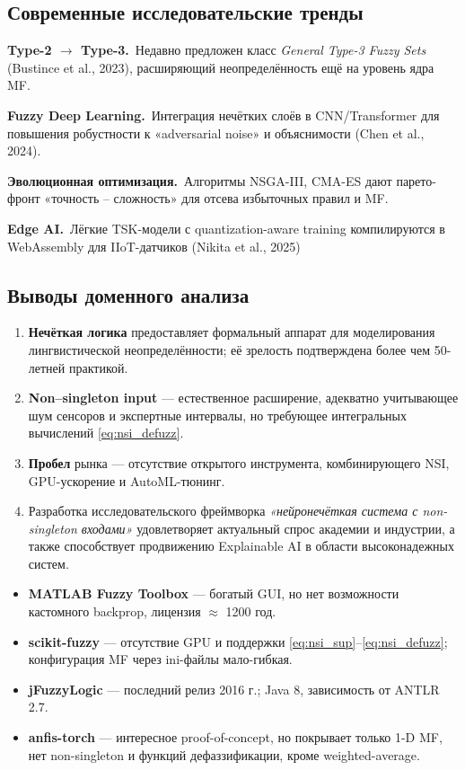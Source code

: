 \subsection{Современные исследовательские тренды}
\label{subsec:trends}

\textbf{Type-2 $\to$ Type-3.}\,
Недавно предложен класс \emph{General Type-3 Fuzzy Sets}
(Bustince et al., 2023), расширяющий неопределённость
ещё на уровень ядра MF.

\textbf{Fuzzy Deep Learning.}\,
Интеграция нечётких слоёв в CNN/Transformer
для повышения робустности к «adversarial noise»
и объяснимости
(Chen et al., 2024).

\textbf{Эволюционная оптимизация.}\,
Алгоритмы NSGA-III, CMA-ES
дают парето-фронт «точность – сложность»
для отсева избыточных правил и MF.

\textbf{Edge AI.}\,
Лёгкие TSK-модели с quantization-aware training
компилируются в WebAssembly
для IIoT-датчиков (Nikita et al., 2025)


\subsection{Выводы доменного анализа}
\label{subsec:conclusion}

\begin{enumerate}
  \item \textbf{Нечёткая логика} предоставляет формальный аппарат
        для моделирования лингвистической неопределённости;
        её зрелость подтверждена более чем 50-летней практикой.
  \item \textbf{Non–singleton input} — естественное расширение,
        адекватно учитывающее шум сенсоров и экспертные интервалы,
        но требующее интегральных вычислений \eqref{eq:nsi_defuzz}.
  \item \textbf{Пробел} рынка — отсутствие открытого инструмента,
        комбинирующего NSI, GPU-ускорение и AutoML-тюнинг.
  \item Разработка исследовательского фреймворка
        \emph{«нейронечёткая система с non-singleton входами»}
        удовлетворяет актуальный спрос академии и индустрии,
        а также способствует продвижению Explainable AI
        в области высоконадежных систем.
\end{enumerate}

\begin{itemize}
  \item \textbf{MATLAB Fuzzy Toolbox} — богатый GUI, но
        нет возможности кастомного backprop,
        лицензия $\approx$ 1200 год.
  \item \textbf{scikit-fuzzy} — отсутствие GPU
        и поддержки \eqref{eq:nsi_sup}–\eqref{eq:nsi_defuzz};
        конфигурация MF через ini-файлы мало-гибкая.
  \item \textbf{jFuzzyLogic} — последний релиз 2016 г.;
        Java 8, зависимость от ANTLR 2.7.
  \item \textbf{anfis-torch} — интересное proof-of-concept,
        но покрывает только 1-D MF, нет non-singleton
        и функций дефаззификации, кроме weighted-average.
\end{itemize}


